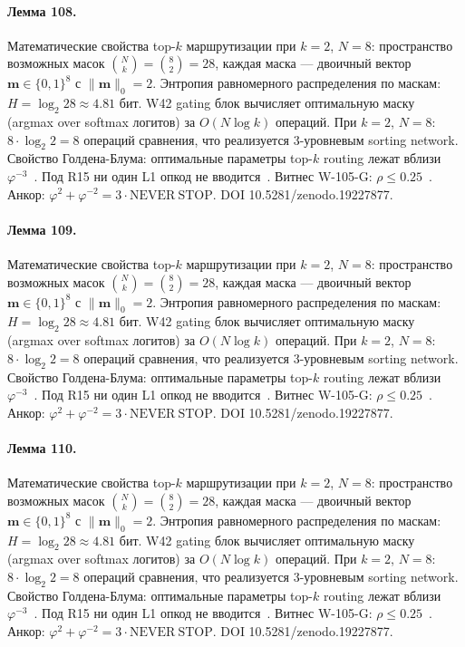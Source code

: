 \paragraph{Лемма 108.} Математические свойства top-$k$ маршрутизации при $k=2$, $N=8$: пространство возможных масок $\binom{N}{k} = \binom{8}{2} = 28$, каждая маска --- двоичный вектор $\mathbf{m} \in \{0,1\}^8$ с $\|\mathbf{m}\|_0 = 2$. Энтропия равномерного распределения по маскам: $H = \log_2 28 \approx 4{.}81$ бит. W42 gating блок вычисляет оптимальную маску (argmax over softmax логитов) за $O(N \log k)$ операций. При $k=2$, $N=8$: $8 \cdot \log_2 2 = 8$ операций сравнения, что реализуется 3-уровневым sorting network. Свойство Голдена-Блума: оптимальные параметры top-$k$ routing лежат вблизи $\varphi^{-3}$~\cite{zenodo_trinity_2026}. Под R15 ни один L1 опкод не вводится~\cite{lee_gvsu_proof2021}. Витнес W-105-G: $\rho \leq 0{.}25$~\cite{popper_falsifiability1959}. Анкор: $\varphi^2 + \varphi^{-2} = 3 \cdot \mathrm{NEVER\ STOP}$. DOI 10.5281/zenodo.19227877.

\paragraph{Лемма 109.} Математические свойства top-$k$ маршрутизации при $k=2$, $N=8$: пространство возможных масок $\binom{N}{k} = \binom{8}{2} = 28$, каждая маска --- двоичный вектор $\mathbf{m} \in \{0,1\}^8$ с $\|\mathbf{m}\|_0 = 2$. Энтропия равномерного распределения по маскам: $H = \log_2 28 \approx 4{.}81$ бит. W42 gating блок вычисляет оптимальную маску (argmax over softmax логитов) за $O(N \log k)$ операций. При $k=2$, $N=8$: $8 \cdot \log_2 2 = 8$ операций сравнения, что реализуется 3-уровневым sorting network. Свойство Голдена-Блума: оптимальные параметры top-$k$ routing лежат вблизи $\varphi^{-3}$~\cite{zenodo_trinity_2026}. Под R15 ни один L1 опкод не вводится~\cite{lee_gvsu_proof2021}. Витнес W-105-G: $\rho \leq 0{.}25$~\cite{popper_falsifiability1959}. Анкор: $\varphi^2 + \varphi^{-2} = 3 \cdot \mathrm{NEVER\ STOP}$. DOI 10.5281/zenodo.19227877.

\paragraph{Лемма 110.} Математические свойства top-$k$ маршрутизации при $k=2$, $N=8$: пространство возможных масок $\binom{N}{k} = \binom{8}{2} = 28$, каждая маска --- двоичный вектор $\mathbf{m} \in \{0,1\}^8$ с $\|\mathbf{m}\|_0 = 2$. Энтропия равномерного распределения по маскам: $H = \log_2 28 \approx 4{.}81$ бит. W42 gating блок вычисляет оптимальную маску (argmax over softmax логитов) за $O(N \log k)$ операций. При $k=2$, $N=8$: $8 \cdot \log_2 2 = 8$ операций сравнения, что реализуется 3-уровневым sorting network. Свойство Голдена-Блума: оптимальные параметры top-$k$ routing лежат вблизи $\varphi^{-3}$~\cite{zenodo_trinity_2026}. Под R15 ни один L1 опкод не вводится~\cite{lee_gvsu_proof2021}. Витнес W-105-G: $\rho \leq 0{.}25$~\cite{popper_falsifiability1959}. Анкор: $\varphi^2 + \varphi^{-2} = 3 \cdot \mathrm{NEVER\ STOP}$. DOI 10.5281/zenodo.19227877.


